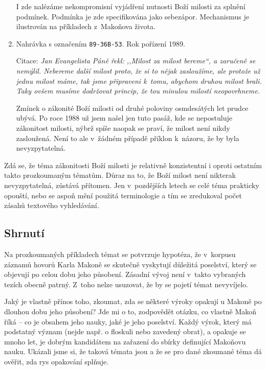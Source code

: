 \begin{enumerate}
{    I zde nalézáme nekompromisní vyjádření nutnosti Boží milosti za splnění
    podmínek. Podmínka je zde specifikována jako sebezápor. Mechanismus je
    ilustrován na příkladech z~Makoňova života.
  }
  \item{
    Nahrávka s označením \texttt{89-36B-53}.
    Rok pořízení 1989.

    Citace: \textit{%
      Jan Evangelista Páně řekl: ,,Milost za milost bereme``, a zaručeně se
      nemýlil. Nebereme další milost proto, že si to nějak zasloužíme, ale
      protože už jednu milost máme, tak jsme připraveni k~tomu, abychom druhou
      milost brali. Taky ovšem musíme dodržovat princip, že tou minulou milostí
      neopovrhneme.
    }

    Zmínek o zákonité Boží milosti od druhé poloviny osmdesátých let prudce
    ubývá. Po roce 1988 už jsem našel jen tuto pasáž, kde se nepostuluje
    zákonitost milosti, nýbrž spíše naopak se praví, že milost není nikdy
    zasloužená. Není to ale v~žádném případě příklon k~názoru, že by byla
    nevyzpytatelná.
  }
\end{enumerate}

Zdá se, že téma zákonitosti Boží milosti je relativně konzistentní i oproti
ostatním takto prozkoumaným tématům. Důraz na to, že Boží milost není nikterak
nevyzpytatelná, zůstává přítomen. Jen v~pozdějších letech se celé téma prakticky
opouští, nebo se aspoň mění použitá terminologie a tím se zredukoval počet
zásahů textového vyhledávání.

\subsection{Shrnutí}

Na prozkoumaných příkladech témat se potvrzuje hypotéza, že v~korpusu záznamů
hovorů Karla Makoně se skutečně vyskytují důležitá poselství, který se objevují
po celou dobu jeho působení. Zásadní vývoj není v~takto vybraných tezích obecně
patrný. Z~toho nelze usuzovat, že by se pojetí témat nevyvíjelo.

Jaký je vlastně přínos toho, zkoumat, zda se některé výroky opakují u Makoně po
dlouhou dobu jeho působení? Jde mi o to, zodpovědět otázku, co vlastně Makoň
říká -- co je obsahem jeho nauky, jaké je jeho poselství. Každý výrok, který má
podstatný význam (nejde např. o floskuli nebo zavedený obrat), a opakuje se
mnoho let, je dobrým kandidátem na zařazení do sbírky definující Makoňovu nauku.
Ukázali jsme si, že taková témata jsou a že se pro dané zkoumané téma dá ověřit,
zda rys opakování splňuje.


